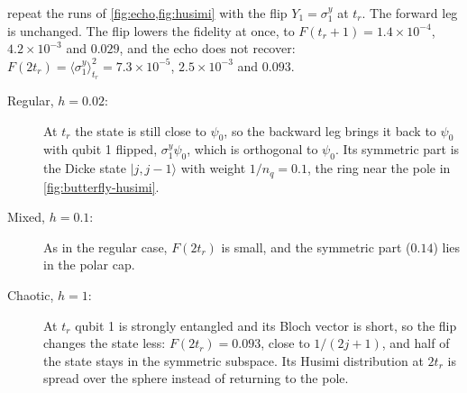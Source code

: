 \documentclass[11pt,a4paper]{article}
\begin{document}
 repeat the runs of \cref{fig:echo,fig:husimi} with the flip
$Y_1=\sigma^y_1$ at $t_r$. The forward leg is unchanged. The flip lowers the fidelity at once, to $F(t_r+1)=1.4\times
10^{-4}$, $4.2\times10^{-3}$ and $0.029$, and the echo does not recover: $F(2t_r)=\langle\sigma^y_1\rangle_{t_r}^2=7.3
\times10^{-5}$, $2.5\times10^{-3}$ and $0.093$.
\begin{description}
\item[Regular, $h=0.02$:] At $t_r$ the state is still close to $\psi_0$, so the backward leg brings it back to $\psi_0$
  with qubit 1 flipped, $\sigma^y_1\psi_0$, which is orthogonal to $\psi_0$. Its symmetric part is the Dicke state
  $|j,j-1\rangle$ with weight $1/n_q=0.1$, the ring near the pole in \cref{fig:butterfly-husimi}.
\item[Mixed, $h=0.1$:] As in the regular case, $F(2t_r)$ is small, and the symmetric part ($0.14$) lies in the polar
  cap.
\item[Chaotic, $h=1$:] At $t_r$ qubit 1 is strongly entangled and its Bloch vector is short, so the flip changes the
  state less: $F(2t_r)=0.093$, close to $1/(2j+1)$, and half of the state stays in the symmetric subspace. Its Husimi
  distribution at $2t_r$ is spread over the sphere instead of returning to the pole.
\end{description}
\end{document}
